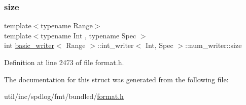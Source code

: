 \mbox{\label{structbasic__writer_1_1int__writer_1_1num__writer_aa76d9a3fe79b0f7e9466e1d19dedbb55}} 
\subsubsection{\texorpdfstring{size}{size}}
{\footnotesize\ttfamily template$<$typename Range$>$ \\
template$<$typename Int , typename Spec $>$ \\
int \hyperlink{classbasic__writer}{basic\+\_\+writer}$<$ Range $>$\+::int\+\_\+writer$<$ Int, Spec $>$\+::num\+\_\+writer\+::size}



Definition at line 2473 of file format.\+h.



The documentation for this struct was generated from the following file\+:\begin{DoxyCompactItemize}
\item 
util/inc/spdlog/fmt/bundled/\hyperlink{format_8h}{format.\+h}\end{DoxyCompactItemize}
